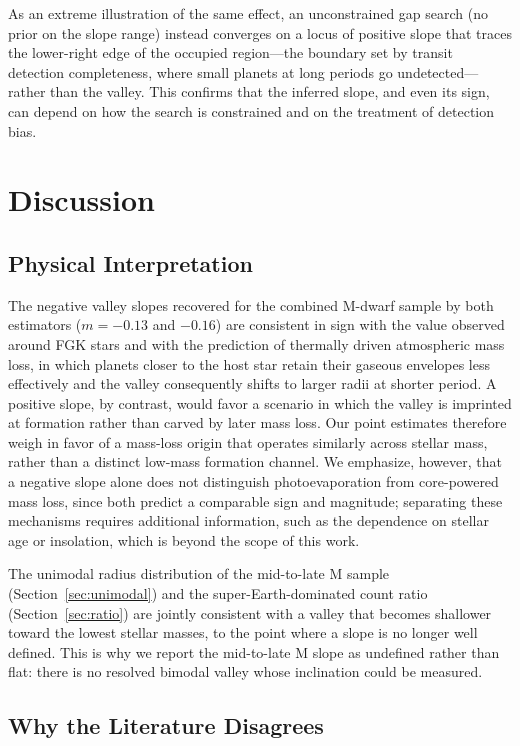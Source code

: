 \documentclass[twocolumn]{aastex701}
\newcommand{\slope}{m}
\begin{document}
As an extreme illustration of the same effect, an unconstrained gap search
(no prior on the slope range) instead converges on a locus of positive slope
that traces the lower-right edge of the occupied region---the boundary set by
transit detection completeness, where small planets at long periods go
undetected---rather than the valley. This confirms that the inferred slope,
and even its sign, can depend on how the search is constrained and on the
treatment of detection bias.

\section{Discussion} \label{sec:discussion}

\subsection{Physical Interpretation}
\label{sec:interp}

The negative valley slopes recovered for the combined M-dwarf sample by both
estimators ($\slope = -0.13$ and $-0.16$) are consistent in sign with the
value observed around FGK stars and with the prediction of thermally driven
atmospheric mass loss, in which planets closer to the host star retain their
gaseous envelopes less effectively and the valley consequently shifts to larger
radii at shorter period. A positive slope, by contrast, would favor a scenario
in which the valley is imprinted at formation rather than carved by later mass
loss. Our point estimates therefore weigh in favor of a mass-loss origin that
operates similarly across stellar mass, rather than a distinct low-mass
formation channel. We emphasize, however, that a negative slope alone does not
distinguish photoevaporation from core-powered mass loss, since both predict a
comparable sign and magnitude; separating these mechanisms requires additional
information, such as the dependence on stellar age or insolation, which is
beyond the scope of this work.

The unimodal radius distribution of the mid-to-late M sample
(Section~\ref{sec:unimodal}) and the super-Earth-dominated count ratio
(Section~\ref{sec:ratio}) are jointly consistent with a valley that becomes
shallower toward the lowest stellar masses, to the point where a slope is no
longer well defined. This is why we report the mid-to-late M slope as undefined
rather than flat: there is no resolved bimodal valley whose inclination could
be measured.

\subsection{Why the Literature Disagrees}
\label{sec:disagree}
\end{document}
